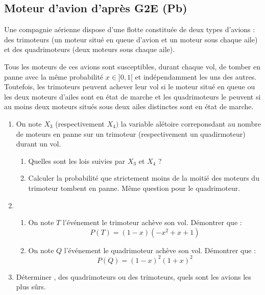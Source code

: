 \subsection{Moteur d'avion d'après G2E (Pb)}

\begin{exercice}[D'après G2E 2014]
Une compagnie aérienne dispose d’une flotte constituée de deux types d’avions : des trimoteurs (un moteur situé en queue d’avion et un moteur sous chaque aile) et des quadrimoteurs (deux moteurs sous chaque aile).

Tous les moteurs de ces avions sont susceptibles, durant chaque vol, de tomber en panne avec la même probabilité $x\in ]0,1[$ et indépendamment les uns des autres. Toutefois, les trimoteurs peuvent achever leur vol si le moteur situé en queue ou les deux moteurs d’ailes sont en  état de marche et les quadrimoteurs le peuvent si au moins deux moteurs situés sous deux ailes distinctes sont en  état de marche.

\begin{enumerate}
\item On note $X_3 $ (respectivement $X_4)$ la variable alétoire correponsdant au nombre de moteurs en panne sur un trimoteur (respectivement un quadirmoteur) durant un vol.
\begin{enumerate}
\item Quelles sont les lois suivies par $X_3$ et  $X_4$ ? 
\item Calculer la probabilité que strictement moins de la moitié des moteurs du trimoteur tombent en panne. Même question pour le quadrimoteur. 
\end{enumerate}
\item 
\begin{enumerate}
\item On note $T$ l'événement \og le trimoteur achève son vol\fg. Démontrer que : 
$$P(T) =(1-x)(-x^2+x+1)$$
\item On note $Q$ l'événement \og le quadrimoteur achève son vol\fg. Démontrer que : 
$$P(Q) =(1-x)^2(1+x)^2$$

\end{enumerate}
\item Déterminer , des quadrimoteurs ou des trimoteurs, quels sont les avions les plus sûrs. 
\end{enumerate}
\end{exercice}


